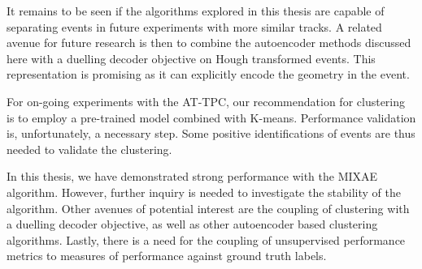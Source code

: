 It remains to be seen if the algorithms explored in this thesis are capable of separating events in future experiments with more similar tracks. A related avenue for future research is then to combine the autoencoder methods discussed here with a duelling decoder objective on Hough transformed events. This representation is promising as it can explicitly encode the geometry in the event.

For on-going experiments with the AT-TPC, our recommendation for clustering is to employ a pre-trained model combined with K-means. Performance validation is, unfortunately, a necessary step. Some positive identifications of events are thus needed to validate the clustering. 

In this thesis, we have demonstrated strong performance with the MIXAE algorithm. However, further inquiry is needed to investigate the stability of the algorithm. Other avenues of potential interest are the coupling of clustering with a duelling decoder objective, as well as other autoencoder based clustering algorithms. Lastly, there is a need for the coupling of unsupervised performance metrics to measures of performance against ground truth labels.  